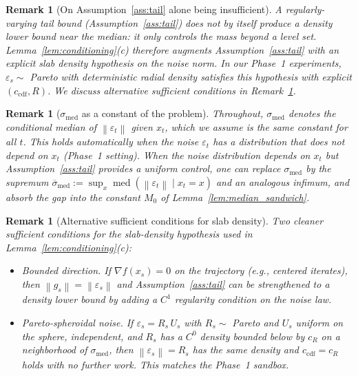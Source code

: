 \documentclass[11pt]{article}
\newtheorem{remark}[theorem]{Remark}
\theoremstyle{definition}
\newcommand{\norm}[1]{\left\| #1 \right\|}
\begin{document}
\begin{remark}[On Assumption~\ref{ass:tail} alone being insufficient]\label{rem:tail_not_density}
A regularly-varying \emph{tail} bound (Assumption~\ref{ass:tail}) does
\emph{not} by itself produce a density lower bound near the median: it only
controls the mass beyond a level set. Lemma~\ref{lem:conditioning}(c)
therefore augments Assumption~\ref{ass:tail} with an explicit slab density
hypothesis on the noise norm. In our Phase~1 experiments,
$\varepsilon_s\sim$ Pareto with deterministic radial density satisfies this
hypothesis with explicit $(c_{\mathrm{cdf}}, R)$. We discuss alternative
sufficient conditions in Remark~\ref{rem:slab_alternatives}.
\end{remark}

\begin{remark}[$\sigma_{\mathrm{med}}$ as a constant of the problem]\label{rem:sigma_med_const}
Throughout, $\sigma_{\mathrm{med}}$ denotes the conditional median of
$\norm{\varepsilon_t}$ given $x_t$, which we assume is the same constant for
all $t$. This holds automatically when the noise $\varepsilon_t$ has a
distribution that does not depend on $x_t$ (Phase~1 setting). When the noise
distribution depends on $x_t$ but Assumption~\ref{ass:tail} provides a uniform
control, one can replace $\sigma_{\mathrm{med}}$ by the supremum
$\overline\sigma_{\mathrm{med}} := \sup_{x}\operatorname{med}(\norm{\varepsilon_t}\mid x_t = x)$
and an analogous infimum, and absorb the gap into the constant $M_0$ of
Lemma~\ref{lem:median_sandwich}.
\end{remark}

\begin{remark}[Alternative sufficient conditions for slab density]\label{rem:slab_alternatives}
Two cleaner sufficient conditions for the slab-density hypothesis used in
Lemma~\ref{lem:conditioning}(c):
\begin{itemize}[noitemsep,leftmargin=*]
  \item \emph{Bounded direction.} If $\nabla f(x_s) = 0$ on the trajectory
    (e.g., centered iterates), then $\norm{g_s} = \norm{\varepsilon_s}$ and
    Assumption~\ref{ass:tail} can be \emph{strengthened} to a density lower
    bound by adding a $C^1$ regularity condition on the noise law.
  \item \emph{Pareto-spheroidal noise.} If $\varepsilon_s = R_s\,U_s$ with
    $R_s\sim$ Pareto and $U_s$ uniform on the sphere, independent, and $R_s$
    has a $C^0$ density bounded below by $c_R$ on a neighborhood of
    $\sigma_{\mathrm{med}}$, then $\norm{\varepsilon_s} = R_s$ has the same
    density and $c_{\mathrm{cdf}} = c_R$ holds with no further work. This
    matches the Phase~1 sandbox.
\end{itemize}
\end{remark}
\end{document}

